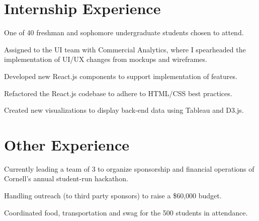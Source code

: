 \documentclass[]{deedy-resume-openfont}
\begin{document}
\begin{minipage}[t]{0.66\textwidth} 


\section{Internship Experience}

\vspace{\topsep} %
\begin{tightemize}
\item One of 40 freshman and sophomore undergraduate students chosen to attend.
\end{tightemize}
\sectionsep

\begin{tightemize}
\item Assigned to the UI team with Commercial Analytics, where I spearheaded the implementation of UI/UX changes from mockups and wireframes.
\item Developed new React.js components to support implementation of features.
\item Refactored the React.js codebase to adhere to HTML/CSS best practices.
\item Created new visualizations to display back-end data using Tableau and D3.js.
\end{tightemize}
\sectionsep


\section{Other Experience}

\begin{tightemize}
\item Currently leading a team of 3 to organize sponsorship and financial operations of Cornell's annual student-run hackathon.
\item Handling outreach (to third party sponsors) to raise a \$60,000 budget.
\item Coordinated food, transportation and swag for the 500 students in attendance.
\end{tightemize}
\sectionsep


\end{minipage}
\end{document}
